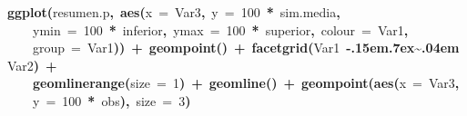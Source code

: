 \documentclass{article}
\makeatletter
\newcommand{\hlnumber}[1]{\textcolor[rgb]{0,0,0}{#1}}%
\newcommand{\hlfunctioncall}[1]{\textcolor[rgb]{.5,0,.33}{\textbf{#1}}}%
\newcommand{\hlkeyword}[1]{\textbf{#1}}%
\newcommand{\hlargument}[1]{\textcolor[rgb]{.69,.25,.02}{#1}}%
\newcommand{\hlsymbol}[1]{#1}%
\def\urltilda{\kern -.15em\lower .7ex\hbox{\~{}}\kern .04em}%
\newcommand{\hlstd}[1]{\textcolor[rgb]{0,0,0}{#1}}%
\newenvironment{kframe}{%
 \def\FrameCommand##1{\hskip\@totalleftmargin \hskip-\fboxsep
 \colorbox{shadecolor}{##1}\hskip-\fboxsep
     \hskip-\linewidth \hskip-\@totalleftmargin \hskip\columnwidth}%
 \MakeFramed {\advance\hsize-\width
   \@totalleftmargin\z@ \linewidth\hsize
   \@setminipage}}%
 {\par\unskip\endMakeFramed}
\newenvironment{knitrout}{}{} %
\makeatother
\begin{document}
\begin{knitrout}
{\begin{kframe}
\begin{flushleft}
\hlstd{}\hlfunctioncall{ggplot}\hlkeyword{(}\hlsymbol{resumen.p}\hlkeyword{,}{\ }\hlfunctioncall{aes}\hlkeyword{(}\hlargument{x}{\ }\hlargument{=}{\ }\hlsymbol{Var3}\hlkeyword{,}{\ }\hlargument{y}{\ }\hlargument{=}{\ }\hlnumber{100}{\ }\hlkeyword{*}{\ }\hlsymbol{sim.media}\hlkeyword{,}\hspace*{\fill}\\
\hlstd{}{\ }{\ }{\ }{\ }\hlargument{ymin}{\ }\hlargument{=}{\ }\hlnumber{100}{\ }\hlkeyword{*}{\ }\hlsymbol{inferior}\hlkeyword{,}{\ }\hlargument{ymax}{\ }\hlargument{=}{\ }\hlnumber{100}{\ }\hlkeyword{*}{\ }\hlsymbol{superior}\hlkeyword{,}{\ }\hlargument{colour}{\ }\hlargument{=}{\ }\hlsymbol{Var1}\hlkeyword{,}\hspace*{\fill}\\
\hlstd{}{\ }{\ }{\ }{\ }\hlargument{group}{\ }\hlargument{=}{\ }\hlsymbol{Var1}\hlkeyword{)}\hlkeyword{)}{\ }\hlkeyword{+}{\ }\hlfunctioncall{geom\usebox{\hlnormalsizeboxunderscore}point}\hlkeyword{(}\hlkeyword{)}{\ }\hlkeyword{+}{\ }\hlfunctioncall{facet\usebox{\hlnormalsizeboxunderscore}grid}\hlkeyword{(}\hlsymbol{Var1}{\ }\hlkeyword{\urltilda{}}{\ }\hlsymbol{Var2}\hlkeyword{)}{\ }\hlkeyword{+}\hspace*{\fill}\\
\hlstd{}{\ }{\ }{\ }{\ }\hlfunctioncall{geom\usebox{\hlnormalsizeboxunderscore}linerange}\hlkeyword{(}\hlargument{size}{\ }\hlargument{=}{\ }\hlnumber{1}\hlkeyword{)}{\ }\hlkeyword{+}{\ }\hlfunctioncall{geom\usebox{\hlnormalsizeboxunderscore}line}\hlkeyword{(}\hlkeyword{)}{\ }\hlkeyword{+}{\ }\hlfunctioncall{geom\usebox{\hlnormalsizeboxunderscore}point}\hlkeyword{(}\hlfunctioncall{aes}\hlkeyword{(}\hlargument{x}{\ }\hlargument{=}{\ }\hlsymbol{Var3}\hlkeyword{,}\hspace*{\fill}\\
\hlstd{}{\ }{\ }{\ }{\ }\hlargument{y}{\ }\hlargument{=}{\ }\hlnumber{100}{\ }\hlkeyword{*}{\ }\hlsymbol{obs}\hlkeyword{)}\hlkeyword{,}{\ }\hlargument{size}{\ }\hlargument{=}{\ }\hlnumber{3}\hlkeyword{)}\mbox{}
\normalfont
\end{flushleft}

\end{kframe}}
\end{knitrout}
\end{document}

